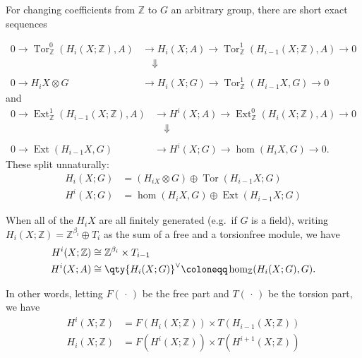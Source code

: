 \begin{theorem}

For changing coefficients from \({\mathbb{Z}}\) to \(G\) an arbitrary
group, there are short exact sequences

\begin{align*}
0\to \operatorname{Tor}_{\mathbb{Z}}^0 (H_{i}(X;{\mathbb{Z}}), A) &\to H_{i}(X;A)\to \operatorname{Tor}_{\mathbb{Z}}^1 (H_{i-1}(X;{\mathbb{Z}}),A)\to 0 \\
& \quad \Downarrow \\ \\
0 \to H_{i} X \otimes G &\to H_{i}(X; G) \to \operatorname{Tor}_{\mathbb{Z}}^1(H_{i-1}X, G) \to 0 
\end{align*}
and
\begin{align*}
0\to \operatorname{Ext} _{{\mathbb{Z}}}^{1}(H_{i-1}(X; {\mathbb{Z}}),A) &\to H^{i}(X; A)\to \operatorname{Ext} _{{\mathbb{Z}}}^{0}(H_{i}(X; {\mathbb{Z}}),A) \to 0 \\
&\quad \Downarrow \\ \\ 
0 \to \operatorname{Ext} (H_{i-1} X, G) &\to H^i(X;G) \to \hom(H_{i} X, G) \to 0
.\end{align*}
These split unnaturally:
\begin{align*}
H_{i}(X;G) &= (H_{iX}\otimes G) \oplus \operatorname{Tor}(H_{i-1}X; G) \\
H^i(X; G) &= \hom(H_{i}X, G) \oplus \operatorname{Ext} (H_{i-1}X; G)
\end{align*}

When all of the \(H_{i}X\) are all finitely generated (e.g.~if \(G\) is
a field), writing
\(H_{i}(X; {\mathbb{Z}}) = {\mathbb{Z}}^{\beta_{i}} \oplus T_{i}\) as
the sum of a free and a torsionfree module, we have
\begin{align*}
H^i(X; {\mathbb{Z}}) &\cong {\mathbb{Z}}^{\beta_{i}} \times T_{i-1} \\
H^i(X; A) &\cong \qty{H_i(X; G)}^\vee\coloneqq\hom_{\mathbb{Z}}(H_{i}(X; G), G)
.\end{align*}

In other words, letting \(F({\,\cdot\,})\) be the free part and
\(T({\,\cdot\,})\) be the torsion part, we have
\begin{align*}
H^i(X; {\mathbb{Z}}) &= F(H_{i}(X; {\mathbb{Z}})) \times T(H_{i-1}(X; {\mathbb{Z}}))\\
H_{i}(X; {\mathbb{Z}}) &= F(H^i(X; {\mathbb{Z}})) \times T(H^{i+1}(X; {\mathbb{Z}}))
\end{align*}

\end{theorem}

